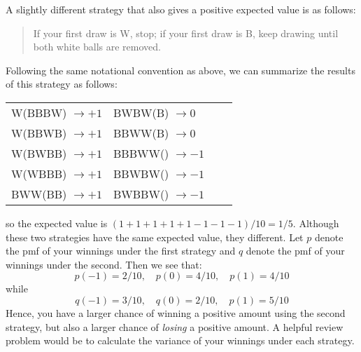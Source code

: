 \documentclass[addpoints,12pt]{exam}\usepackage[]{graphicx}\usepackage[]{color}
\begin{document}
\begin{questions}
\begin{solution}
  A slightly different strategy that also gives a positive expected value is as follows: 
  \begin{quote}
    If your first draw is W, stop; if your first draw is B, keep drawing until both white balls are removed.
  \end{quote}
  Following the same notational convention as above, we can summarize the results of this strategy as follows:
  \begin{center}
    \begin{tabular}[h]{llll}
      W(BBBW) $\rightarrow +1$& BWBW(B) $\rightarrow 0$\\
      W(BBWB) $\rightarrow +1$& BBWW(B) $\rightarrow 0$\\
      W(BWBB) $\rightarrow +1$& BBBWW() $\rightarrow -1$\\
      W(WBBB) $\rightarrow +1$& BBWBW() $\rightarrow -1$\\
      BWW(BB) $\rightarrow +1$& BWBBW() $\rightarrow -1$
    \end{tabular}
  \end{center}
  so the expected value is $(1 + 1 + 1 + 1 + 1 - 1 - 1 - 1)/10 = 1/5$.
  Although these two strategies have the same expected value, they different. 
  Let $p$ denote the pmf of your winnings under the first strategy and $q$ denote the pmf of your winnings under the second.
  Then we see that:
  \[
    p(-1) = 2/10, \quad p(0) = 4/10, \quad p(1) = 4/10
  \]
  while 
  \[
    q(-1) = 3/10, \quad q(0) = 2/10, \quad p(1) = 5/10
  \]
  Hence, you have a larger chance of winning a positive amount using the second strategy, but also a larger chance of \emph{losing} a positive amount.
  A helpful review problem would be to calculate the variance of your winnings under each strategy.
  
  \end{solution}


\end{questions}
\end{document}

